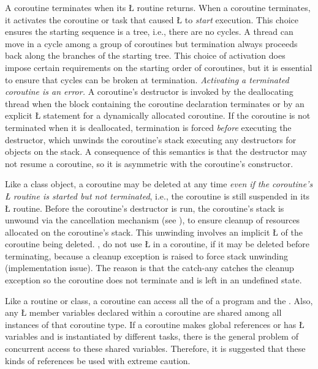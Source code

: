 \documentclass[openright,twoside]{report}
\begin{document}
A coroutine terminates when its \LGinlinetrue\LGbegin\lgrinde\L{}\endlgrinde\LGend{} routine returns.
When a coroutine terminates, it activates the coroutine or task that caused \LGinlinetrue\LGbegin\lgrinde\L{}\endlgrinde\LGend{} to \emph{start} execution.
This choice ensures the starting sequence is a tree, i.e., there are no cycles.
A thread can move in a cycle among a group of coroutines but termination always proceeds back along the branches of the starting tree.
This choice of activation does impose certain requirements on the starting order of coroutines, but it is essential to ensure that cycles can be broken at termination.
\emph{Activating a terminated coroutine is an error.}
A coroutine's destructor is invoked by the deallocating thread when the block containing the coroutine declaration terminates or by an explicit \LGinlinetrue\LGbegin\lgrinde\L{}\endlgrinde\LGend{} statement for a dynamically allocated coroutine.
If the coroutine is not terminated when it is deallocated, termination is forced \emph{before} executing the destructor, which unwinds the coroutine's stack executing any destructors for objects on the stack.
A consequence of this semantics is that the destructor may not resume a coroutine, so it is asymmetric with the coroutine's constructor.

Like\label{p:AutoUnwindCoroutine} a class object, a coroutine may be deleted at any time \emph{even if the coroutine's \LGinlinetrue\LGbegin\lgrinde\L{}\endlgrinde\LGend{} routine is started but not terminated}, i.e., the coroutine is still suspended in its \LGinlinetrue\LGbegin\lgrinde\L{}\endlgrinde\LGend{} routine.
Before the coroutine's destructor is run, the coroutine's stack is unwound via the cancellation mechanism (see ), to ensure cleanup of resources allocated on the coroutine's stack.
This unwinding involves an implicit \LGinlinetrue\LGbegin\lgrinde\L{}\endlgrinde\LGend{} of the coroutine being deleted. 
, do not use \LGinlinetrue\LGbegin\lgrinde\L{}\endlgrinde\LGend{} in a coroutine, if it may be deleted before terminating, because a cleanup exception is raised to force stack unwinding (implementation issue).
The reason is that the catch-any catches the cleanup exception so the coroutine does not terminate and is left in an undefined state.

Like a routine or class, a coroutine can access all the  of a \CC program and the .
Also, any \LGinlinetrue\LGbegin\lgrinde\L{}\endlgrinde\LGend{} member variables declared within a coroutine are shared among all instances of that coroutine type.
If a coroutine makes global references or has \LGinlinetrue\LGbegin\lgrinde\L{}\endlgrinde\LGend{} variables and is instantiated by different tasks, there is the general problem of concurrent access to these shared variables.
Therefore, it is suggested that these kinds of references be used with extreme caution.
\end{document}
